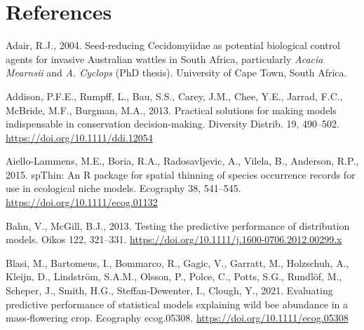 \documentclass[12pt,]{article}
\begin{document}
\newpage

\hypertarget{references}{%
\section{References}\label{references}}

\setlength{\parindent}{-0.0in}
\setlength{\leftskip}{0.0in}
\setlength{\parskip}{8pt}
\vspace*{-0.0in}

\noindent

\newlength{\cslhangindent}
\newenvironment{CSLReferences}%
{\setlength{\parindent}{0pt}%
\everypar{\setlength{\hangindent}{\cslhangindent}}\ignorespaces}%
{\par}

\hypertarget{refs}{}
\begin{CSLReferences}{1}{0}
\leavevmode\hypertarget{ref-Adair2004}{}%
Adair, R.J., 2004. Seed-reducing {Cecidomyiidae} as potential biological
control agents for invasive {Australian} wattles in {South Africa},
particularly {\emph{Acacia}}{ \emph{Mearnsii}} and {\emph{A}}{\emph{.
Cyclops}} (PhD thesis). {University of Cape Town}, {South Africa}.

\leavevmode\hypertarget{ref-Addison2013}{}%
Addison, P.F.E., Rumpff, L., Bau, S.S., Carey, J.M., Chee, Y.E., Jarrad,
F.C., McBride, M.F., Burgman, M.A., 2013. Practical solutions for making
models indispensable in conservation decision-making. Diversity Distrib.
19, 490--502. \url{https://doi.org/10.1111/ddi.12054}

\leavevmode\hypertarget{ref-Aiello-Lammens2015}{}%
Aiello-Lammens, M.E., Boria, R.A., Radosavljevic, A., Vilela, B.,
Anderson, R.P., 2015. {spThin}: An {R} package for spatial thinning of
species occurrence records for use in ecological niche models. Ecography
38, 541--545. \url{https://doi.org/10.1111/ecog.01132}

\leavevmode\hypertarget{ref-Bahn2013}{}%
Bahn, V., McGill, B.J., 2013. Testing the predictive performance of
distribution models. Oikos 122, 321--331.
\url{https://doi.org/10.1111/j.1600-0706.2012.00299.x}

\leavevmode\hypertarget{ref-Blasi2021}{}%
Blasi, M., Bartomeus, I., Bommarco, R., Gagic, V., Garratt, M.,
Holzschuh, A., Kleijn, D., Lindström, S.A.M., Olsson, P., Polce, C.,
Potts, S.G., Rundlöf, M., Scheper, J., Smith, H.G., Steffan‐Dewenter,
I., Clough, Y., 2021. Evaluating predictive performance of statistical
models explaining wild bee abundance in a mass‐flowering crop. Ecography
ecog.05308. \url{https://doi.org/10.1111/ecog.05308}


\end{CSLReferences}
\end{document}
